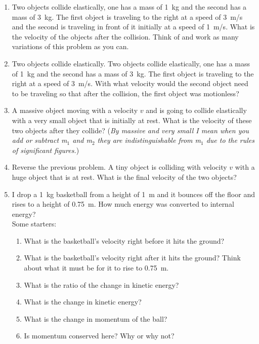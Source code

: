 \begin{enumerate}
\item Two objects collide elastically, one has a mass of \SI{1}{kg} and the second has a mass of \SI{3}{kg}. The first object is traveling to the right at a speed of \SI{3}{m/s} and the second is traveling in front of it initially at a speed of \SI{1}{m/s}. What is the velocity of the objects after the collision. Think of and work as many variations of this problem as you can.
\giantskip

\item Two objects collide elastically. Two objects collide elastically, one has a mass of \SI{1}{kg} and the second has a mass of \SI{3}{kg}. The first object is traveling to the right at a speed of \SI{3}{m/s}. With what velocity would the second object need to be traveling so that after the collision, the first object was motionless?


\item
A massive object moving with a velocity $v$ and is going to collide elastically with a very small object that is initially at rest. What is the velocity of these two objects after they collide? (\emph{By massive and very small I mean when you add or subtract m$_1$ and m$_2$ they are indistinguishable from m$_1$ due to the rules of significant figures.})

\item 
Reverse the previous problem. A tiny object is colliding with velocity $v$ with a huge object that is at rest. What is the final velocity of the two objects?

\item 
I drop a \SI{1}{kg} basketball from a height of \SI{1}{\meter} and it bounces off the floor and rises to a height of \SI{0.75}{\meter}. How much energy was converted to internal energy?\\
Some starters:
\begin{enumerate}
	\item What is the basketball's velocity right before it hits the ground?
	\item What is the basketball's velocity right after it hits the ground? Think about what it must be for it to rise to \SI{0.75}{\meter}.
	\item What is the ratio of the change in kinetic energy?
	\item What is the change in kinetic energy?
	\item What is the change in momentum of the ball?
	\item Is momentum conserved here? Why or why not?
\end{enumerate}


\end{enumerate}
